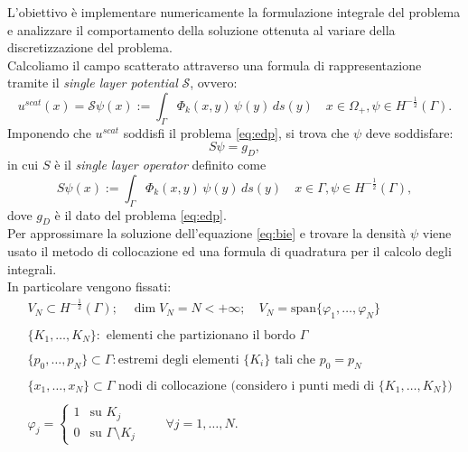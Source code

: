 \documentclass[a4paper,12pt]{article}
\theoremstyle{definition}
\begin{document}
L'obiettivo è implementare numericamente la formulazione integrale del problema e analizzare il comportamento della soluzione ottenuta al variare della discretizzazione del problema. \\
Calcoliamo il campo scatterato attraverso una formula di rappresentazione tramite il \textit{single layer potential} $\mathcal{S}$, ovvero:
\begin{equation}
    \label{eq:single_layer}
    u^{scat}(x) = \mathcal{S}\psi(x):=\int_\Gamma \Phi_k(x, y)\,\psi(y) \, ds(y) \quad x \in \Omega_+, \psi \in H^{-\frac{1}{2}}(\Gamma).
\end{equation}
Imponendo che $u^{scat}$ soddisfi il problema \ref{eq:edp}, si trova che $\psi$ deve soddisfare:
\begin{equation}
    \label{eq:bie}
    S\psi=g_D,
\end{equation}
in cui $S$ è il \textit{single layer operator} definito come 
\begin{equation}
    \label{eq:slo}
    S\psi(x):=\int_\Gamma \Phi_k(x, y)\,\psi(y) \, ds(y) \quad x \in \Gamma, \psi \in H^{-\frac{1}{2}}(\Gamma),
\end{equation}
dove $g_D$ è il dato del problema \ref{eq:edp}.\\
Per approssimare la soluzione dell'equazione \ref{eq:bie} e trovare la densità $\psi$ viene usato il metodo di collocazione ed una formula di quadratura per il calcolo degli integrali.\\
In particolare vengono fissati:
\begin{align*}
    &V_N \subset H^{-\frac{1}{2}}(\Gamma); \quad \dim V_N = N < + \infty; \quad V_N = \text{span} \{\varphi_1, \dots, \varphi_N\}\\\\
    &\{K_1, \dots, K_N\}: \text{ elementi che partizionano il bordo } \Gamma\\\\
    & \{p_0, \dots, p_N\} \subset \Gamma : \text{estremi degli elementi } \{K_i\} \text{ tali che } p_0=p_N\\\\
    &\{x_1, \dots, x_N\} \subset \Gamma \text{ nodi di collocazione (considero i punti medi di } \{K_1, \dots, K_N\}) \\\\
    & \varphi_j = 
    \begin{cases}
        1 & \text{su } K_j\\
        0 & \text{su } \Gamma \setminus K_j
    \end{cases}
    \qquad \forall j=1, \dots, N.
\end{align*}
\end{document}
